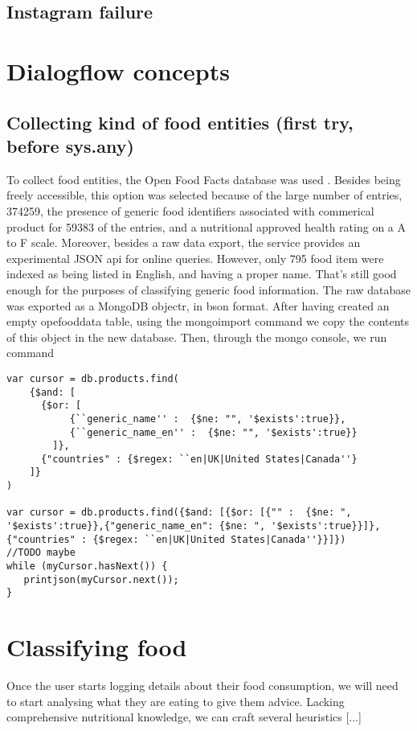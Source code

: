 \subsection*{Instagram failure}
\section*{Dialogflow concepts}
\subsection*{Collecting kind of food entities (first try, before sys.any)}
To collect food entities, the Open Food Facts database was used \cite{openfoodfacts}. Besides being freely accessible, this option was selected because of the large number of entries, 374259, the presence of generic food identifiers associated with commerical product for 59383 of the entries, and a nutritional approved health rating on a A to F scale. Moreover, besides a raw data export, the service provides an experimental JSON api for online queries. However, only 795 food item were indexed as being listed in English, and having a proper name. That's still good enough for the purposes of classifying generic food information.
The raw database was exported as a MongoDB \cite{mongo} objectr, in bson format. After having created an empty opefooddata table, using the mongoimport command we copy the contents of this object in the new database. Then, through the mongo console, we run command
\begin{lstlisting}
var cursor = db.products.find( 
    {$and: [
      {$or: [
           {``generic_name'' :  {$ne: "", '$exists':true}},
           {``generic_name_en'' :  {$ne: "", '$exists':true}}
        ]},
      {"countries" : {$regex: ``en|UK|United States|Canada''}
    ]}
)

var cursor = db.products.find({$and: [{$or: [{"" :  {$ne: ", '$exists':true}},{"generic_name_en": {$ne: ", '$exists':true}}]}, {"countries" : {$regex: ``en|UK|United States|Canada''}}]})
//TODO maybe 
while (myCursor.hasNext()) {
   printjson(myCursor.next());
}
\end{lstlisting}


\section*{Classifying food}
Once the user starts logging details about their food consumption, we will need to start analysing what they are eating to give them advice. Lacking comprehensive nutritional knowledge, we can craft several heuristics [...]


